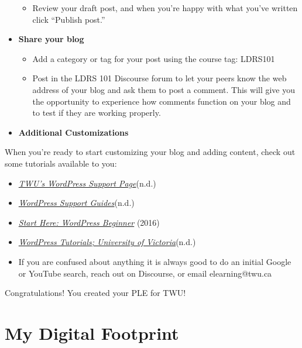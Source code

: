 \documentclass[
  letterpaper,
  DIV=11,
  numbers=noendperiod]{scrreprt}
\providecommand{\tightlist}{%
  \setlength{\itemsep}{0pt}\setlength{\parskip}{0pt}}\usepackage{longtable,booktabs,array}
\begin{document}
\begin{tcolorbox}
\begin{itemize}
  \begin{itemize}
  \tightlist
  \item
    Review your draft post, and when you're happy with what you've
    written click ``Publish post.''
  \end{itemize}
\item
  \textbf{Share your blog}

  \begin{itemize}
  \tightlist
  \item
    Add a category or tag for your post using the course tag: LDRS101
  \item
    Post in the LDRS 101 Discourse forum to let your peers know the web
    address of your blog and ask them to post a comment. This will give
    you the opportunity to experience how comments function on your blog
    and to test if they are working properly.
  \end{itemize}
\item
  \textbf{Additional Customizations}
\end{itemize}

When you're ready to start customizing your blog and adding content,
check out some tutorials available to you:

\begin{itemize}
\item
  \href{https://servicehub.twu.ca/TDClient/1904/Portal/KB/ArticleDet?ID=146597}{\emph{TWU's
  WordPress Support Page}}(n.d.)
\item
  \href{https://wordpress.com/support/}{\emph{WordPress Support
  Guides}}(n.d.)
\item
  \href{https://www.wpbeginner.com/start-here/}{\emph{Start Here:
  WordPress Beginner}} (2016)
\item
  \href{https://onlineacademiccommunity.uvic.ca/wordpress-tutorials/}{\emph{WordPress
  Tutorials; University of Victoria}}(n.d.)
\item
  If you are confused about anything it is always good to do an initial
  Google or YouTube search, reach out on Discourse, or email
  elearning@twu.ca
\end{itemize}

\end{tcolorbox}

Congratulations! You created your PLE for TWU!

\section{My Digital Footprint}\label{my-digital-footprint}
\end{document}
